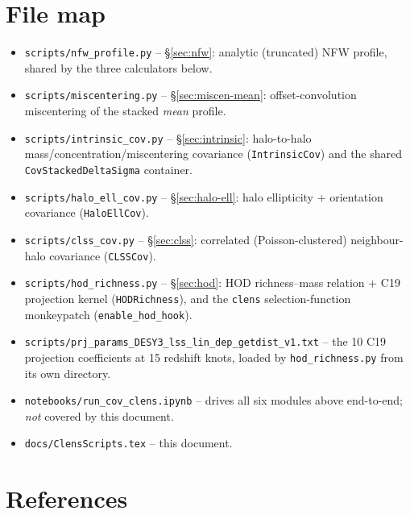 \documentclass[a4paper, 11pt]{article}
\newcommand{\modname}[1]{\textcolor{kwcol}{\texttt{#1}}}
\newcommand{\pyfile}[1]{{\small\texttt{#1}}}
\begin{document}
\section{File map}
\label{sec:files}

\begin{itemize}
  \setlength\itemsep{1pt}
  \item \pyfile{scripts/nfw\_profile.py} -- \S\ref{sec:nfw}: analytic
    (truncated) NFW profile, shared by the three calculators below.
  \item \pyfile{scripts/miscentering.py} -- \S\ref{sec:miscen-mean}:
    offset-convolution miscentering of the stacked \emph{mean}
    profile.
  \item \pyfile{scripts/intrinsic\_cov.py} -- \S\ref{sec:intrinsic}:
    halo-to-halo mass/concentration/miscentering covariance
    (\texttt{IntrinsicCov}) and the shared
    \texttt{CovStackedDeltaSigma} container.
  \item \pyfile{scripts/halo\_ell\_cov.py} -- \S\ref{sec:halo-ell}:
    halo ellipticity + orientation covariance (\texttt{HaloEllCov}).
  \item \pyfile{scripts/clss\_cov.py} -- \S\ref{sec:clss}: correlated
    (Poisson-clustered) neighbour-halo covariance (\texttt{CLSSCov}).
  \item \pyfile{scripts/hod\_richness.py} -- \S\ref{sec:hod}: HOD
    richness--mass relation + C19 projection kernel
    (\texttt{HODRichness}), and the \modname{clens} selection-function
    monkeypatch (\texttt{enable\_hod\_hook}).
  \item \pyfile{scripts/prj\_params\_DESY3\_lss\_lin\_dep\_getdist\_v1.txt}
    -- the 10 C19 projection coefficients at 15 redshift knots,
    loaded by \texttt{hod\_richness.py} from its own directory.
  \item \pyfile{notebooks/run\_cov\_clens.ipynb} -- drives all six
    modules above end-to-end; \emph{not} covered by this document.
  \item \pyfile{docs/ClensScripts.tex} -- this document.
\end{itemize}

\section{References}
\label{sec:refs}
\end{document}
